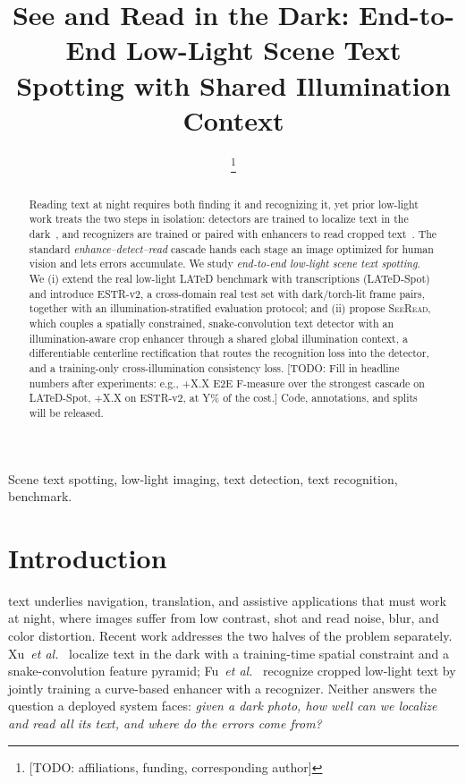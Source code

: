\documentclass[journal]{IEEEtran}
\newcommand{\todo}[1]{{\color{red}[TODO: #1]}}
\newcommand{\method}{\textsc{SeeRead}}
\begin{document}
\title{See and Read in the Dark: End-to-End Low-Light Scene Text Spotting with Shared Illumination Context}

\author{
\thanks{\todo{affiliations, funding, corresponding author}}}

\maketitle

\begin{abstract}
Reading text at night requires both finding it and recognizing it, yet prior low-light work treats the two steps in isolation: detectors are trained to localize text in the dark~\cite{xu2024seeing}, and recognizers are trained or paired with enhancers to read cropped text~\cite{fu2026reading}. The standard \emph{enhance--detect--read} cascade hands each stage an image optimized for human vision and lets errors accumulate. We study \emph{end-to-end low-light scene text spotting}. We (i) extend the real low-light LATeD benchmark with transcriptions (LATeD-Spot) and introduce ESTR-v2, a cross-domain real test set with dark/torch-lit frame pairs, together with an illumination-stratified evaluation protocol; and (ii) propose \method{}, which couples a spatially constrained, snake-convolution text detector with an illumination-aware crop enhancer through a shared global illumination context, a differentiable centerline rectification that routes the recognition loss into the detector, and a training-only cross-illumination consistency loss. \todo{Fill in headline numbers after experiments: e.g., +X.X E2E F-measure over the strongest cascade on LATeD-Spot, +X.X on ESTR-v2, at Y\% of the cost.} Code, annotations, and splits will be released.
\end{abstract}

\begin{IEEEkeywords}
Scene text spotting, low-light imaging, text detection, text recognition, benchmark.
\end{IEEEkeywords}

\section{Introduction}
 text underlies navigation, translation, and assistive applications that must work at night, where images suffer from low contrast, shot and read noise, blur, and color distortion. Recent work addresses the two halves of the problem separately. Xu~\emph{et al.}~\cite{xu2024seeing} localize text in the dark with a training-time spatial constraint and a snake-convolution feature pyramid; Fu~\emph{et al.}~\cite{fu2026reading} recognize cropped low-light text by jointly training a curve-based enhancer with a recognizer. Neither answers the question a deployed system faces: \emph{given a dark photo, how well can we localize \emph{and} read all its text, and where do the errors come from?}
\end{document}
